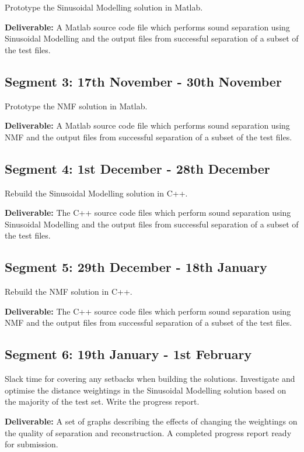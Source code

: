 \documentclass[12pt]{article}
\begin{document}
Prototype the Sinusoidal Modelling solution in Matlab.

\textbf{Deliverable:} A Matlab source code file which performs sound separation using Sinusoidal Modelling and the output files from successful separation of a subset of the test files.

\subsection*{Segment 3: 17th November - 30th November}

Prototype the NMF solution in Matlab.

\textbf{Deliverable:} A Matlab source code file which performs sound separation using NMF and the output files from successful separation of a subset of the test files.

\subsection*{Segment 4: 1st December - 28th December}

Rebuild the Sinusoidal Modelling solution in C++.

\textbf{Deliverable:} The C++ source code files which perform sound separation using Sinusoidal Modelling and the output files from successful separation of a subset of the test files.

\subsection*{Segment 5: 29th December - 18th January}

Rebuild the NMF solution in C++.

\textbf{Deliverable:} The C++ source code files which perform sound separation using NMF and the output files from successful separation of a subset of the test files.

\subsection*{Segment 6: 19th January - 1st February}

Slack time for covering any setbacks when building the solutions. Investigate and optimise the distance weightings in the Sinusoidal Modelling solution based on the majority of the test set. Write the progress report.

\textbf{Deliverable:} A set of graphs describing the effects of changing the weightings on the quality of separation and reconstruction. A completed progress report ready for submission.
\end{document}
